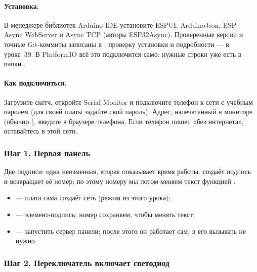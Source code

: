 \paragraph{Установка.} В менеджере библиотек Arduino IDE установите \textsf{ESPUI}, \textsf{ArduinoJson},
\textsf{ESP Async WebServer} и \textsf{Async TCP} (авторы ESP32Async). Проверенные версии и точные
Git-коммиты записаны в ; проверку установки и подробности --- в уроке~39.
В PlatformIO всё это подключится само: нужные строки уже есть в  папки .

\paragraph{Как подключиться.} Загрузите скетч, откройте Serial Monitor и подключите телефон к сети
 с учебным паролем  (для своей платы задайте свой пароль).
Адрес, напечатанный в мониторе (обычно ), введите в браузере телефона.
Если телефон пишет «без интернета», оставайтесь в этой сети.

\subsubsection{Шаг 1. Первая панель}

Две подписи: одна неизменная, вторая показывает время работы.  создаёт подпись и
возвращает её номер; по этому номеру мы потом меняем текст функцией .


\begin{itemize}[leftmargin=*]
  \item {} --- плата сама создаёт сеть (режим из этого урока);
  \item {} --- элемент-подпись; номер сохраняем, чтобы менять текст;
  \item {} --- запустить сервер панели; после этого он работает сам, в  его вызывать не нужно.
\end{itemize}

\subsubsection{Шаг 2. Переключатель включает светодиод}

